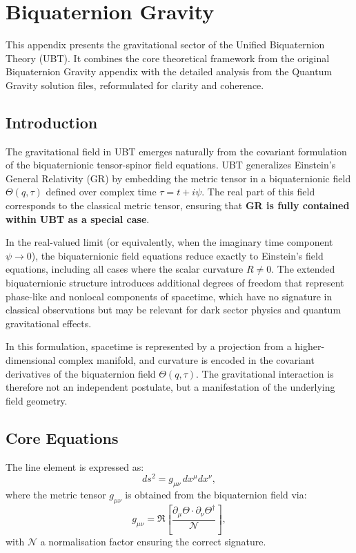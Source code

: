 
\section{Biquaternion Gravity}

This appendix presents the gravitational sector of the Unified Biquaternion Theory (UBT).
It combines the core theoretical framework from the original Biquaternion Gravity appendix
with the detailed analysis from the Quantum Gravity solution files, reformulated for
clarity and coherence.

\subsection{Introduction}

The gravitational field in UBT emerges naturally from the covariant formulation of the
biquaternionic tensor-spinor field equations. UBT generalizes Einstein's General Relativity (GR) 
by embedding the metric tensor in a biquaternionic field $\Theta(q,\tau)$ defined over 
complex time $\tau = t + i\psi$. The real part of this field corresponds to the classical 
metric tensor, ensuring that \textbf{GR is fully contained within UBT as a special case}.

In the real-valued limit (or equivalently, when the imaginary time component $\psi \to 0$), 
the biquaternionic field equations reduce exactly to Einstein's field equations, including 
all cases where the scalar curvature $R \neq 0$. The extended biquaternionic structure 
introduces additional degrees of freedom that represent phase-like and nonlocal components 
of spacetime, which have no signature in classical observations but may be relevant for 
dark sector physics and quantum gravitational effects.

In this formulation, spacetime is represented by a projection from a higher-dimensional
complex manifold, and curvature is encoded in the covariant derivatives of the
biquaternion field $\Theta(q,\tau)$. The gravitational interaction is therefore not an
independent postulate, but a manifestation of the underlying field geometry.

\subsection{Core Equations}

The line element is expressed as:
\begin{equation}
  ds^2 = g_{\mu\nu} \, dx^\mu dx^\nu ,
\end{equation}
where the metric tensor $g_{\mu\nu}$ is obtained from the biquaternion field via:
\begin{equation}
  g_{\mu\nu} = \Re\left[ \frac{\partial_\mu \Theta \cdot \partial_\nu \Theta^\dagger}{\mathcal{N}} \right],
\end{equation}
with $\mathcal{N}$ a normalisation factor ensuring the correct signature.


